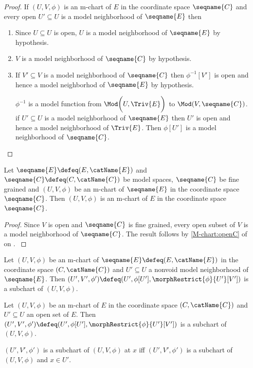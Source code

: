 \documentclass{article}
\begin{document}
\begin{lemma}[M-charts]
\begin{enumerate}
\begin{proof}
If $(U, V, \phi)$ is an m-chart of $E$ in the coordinate space
$\seqname{C}$ and every open
\nobreaks
  {{
    $U'\subseteq U$
  }}
is a model neighborhood of $\seqname{E}$ then
\begin{enumerate}
\item Since $U \subseteq U$ is open, $U$ is a model neighborhood of
$\seqname{E}$ by hypothesis.

\item $V$ is a model neighborhood of $\seqname{C}$ by hypothesis.

\item If $V' \subseteq V$ is a model neighborhood of $\seqname{C}$ then
$\phi^{-1}[V']$ is open and hence a model neighborhod of $\seqname{E}$
by hypothesis.

$\phi^{-1}$ is a model function from $\Mod \biggl ( U,\Triv{E} \biggr )$ to
$\Mod(V,\seqname{C})$. if $U' \subseteq U$ is a model neighborhood of
$\seqname{E}$ then $U'$ is open and hence a model neighborhood of
$\Triv{E}$. Then $\phi[U']$ is a model neighborhood of $\seqname{C}$.
\end{enumerate}
\end{proof}
\end{enumerate}
\end{lemma}

\begin{corollary}[M-charts]
\label{cor:M-chart}
Let $\seqname{E} \defeq (E, \catName{E})$ and
$\seqname{C} \defeq (C,\catName{C})$ be model spaces, $\seqname{C}$ be
fine grained and $(U, V, \phi)$ be an m-chart of $\seqname{E}$ in the
coordinate space $\seqname{C}$.  Then $(U, V, \phi)$ is an m-chart of
$E$ in the coordinate space $\seqname{C}$.

\begin{proof}
Since $V$ is open and $\seqname{C}$ is fine grained, every open subset of
$V$ is a model neighborhood of $\seqname{C}$. The result follows by
\cref{M-chart:openC} of
{
  \showlabelsinline
  on .
}
\end{proof}
\end{corollary}

\begin{definition}[Subcharts]
\label{def:M-subchart}
Let $(U, V, \phi)$ be an m-chart of
$\seqname{E} \defeq (E, \catName{E})$ in the coordinate space
$(C,\catName{C})$ and $U' \subseteq U$ a nonvoid model neighborhood of
$\seqname{E}$. Then
$(U', V', \phi') \defeq (U', \phi[U'], \morphRestrict{\phi}{U'}[V'])$ is a
subchart of $(U, V, \phi)$.

Let $(U, V, \phi)$ be an m-chart of $E$ in the coordinate
space $(C,\catName{C})$ and $U' \subseteq U$ an open set of
$E$. Then
$(U', V', \phi') \defeq (U', \phi[U'], \morphRestrict{\phi}{U'}[V'])$
is a subchart of $(U, V, \phi)$.

$(U', V', \phi')$ is a subchart of $(U, V, \phi)$ at  $x$ iff
$(U', V', \phi')$ is a subchart of $(U, V, \phi)$ and $x \in U'$.
\end{definition}
\end{document}
